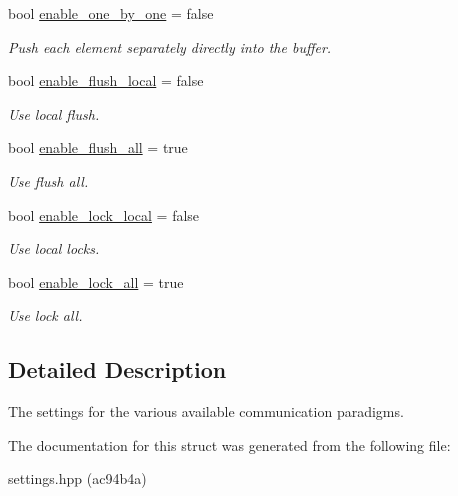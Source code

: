 \begin{DoxyCompactItemize}
bool \hyperlink{structSchwarzWrappers_1_1Settings_1_1comm__settings_a94a65410d1c436a47dbb116b5d3d5af1}{enable\+\_\+one\+\_\+by\+\_\+one} = false
\begin{DoxyCompactList}\small\item\em Push each element separately directly into the buffer. \end{DoxyCompactList}\item 
\mbox{\label{structSchwarzWrappers_1_1Settings_1_1comm__settings_a70c60458477096cecd87a53139ee61e8}} 
bool \hyperlink{structSchwarzWrappers_1_1Settings_1_1comm__settings_a70c60458477096cecd87a53139ee61e8}{enable\+\_\+flush\+\_\+local} = false
\begin{DoxyCompactList}\small\item\em Use local flush. \end{DoxyCompactList}\item 
\mbox{\label{structSchwarzWrappers_1_1Settings_1_1comm__settings_a147d1ec7e1eaa5bea9e640d0bb6a7636}} 
bool \hyperlink{structSchwarzWrappers_1_1Settings_1_1comm__settings_a147d1ec7e1eaa5bea9e640d0bb6a7636}{enable\+\_\+flush\+\_\+all} = true
\begin{DoxyCompactList}\small\item\em Use flush all. \end{DoxyCompactList}\item 
\mbox{\label{structSchwarzWrappers_1_1Settings_1_1comm__settings_aef1f78be36243e63b9ef7c04dee35f1b}} 
bool \hyperlink{structSchwarzWrappers_1_1Settings_1_1comm__settings_aef1f78be36243e63b9ef7c04dee35f1b}{enable\+\_\+lock\+\_\+local} = false
\begin{DoxyCompactList}\small\item\em Use local locks. \end{DoxyCompactList}\item 
\mbox{\label{structSchwarzWrappers_1_1Settings_1_1comm__settings_a9158358e7f737ae5769c5c51730dee7b}} 
bool \hyperlink{structSchwarzWrappers_1_1Settings_1_1comm__settings_a9158358e7f737ae5769c5c51730dee7b}{enable\+\_\+lock\+\_\+all} = true
\begin{DoxyCompactList}\small\item\em Use lock all. \end{DoxyCompactList}\end{DoxyCompactItemize}


\subsection{Detailed Description}
The settings for the various available communication paradigms. 

The documentation for this struct was generated from the following file\+:\begin{DoxyCompactItemize}
\item 
settings.\+hpp (ac94b4a)\end{DoxyCompactItemize}
